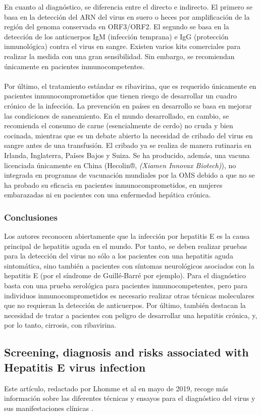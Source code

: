 \documentclass[11 pt]{article}
\begin{document}
En cuanto al diagnóstico, se diferencia entre el directo e indirecto. El primero se basa en la detección del ARN del virus en suero o heces por amplificación de la región del genoma conservada en ORF3/ORF2. El segundo se basa en la detección de los anticuerpos IgM (infección temprana) e IgG (protección inmunológica) contra el virus en sangre. Existen varios kits comerciales para realizar la medida con una gran sensibilidad. Sin embargo, se recomiendan únicamente en pacientes inmunocompetentes.\\\\
Por último, el tratamiento estándar es ribavirina, que es requerido únicamente en pacientes inmunocomprometidos que tienen riesgo de desarrollar un cuadro crónico de la infección. La prevención en países en desarrollo se basa en mejorar las condiciones de saneamiento. En el mundo desarrollado, en cambio, se recomienda el consumo de carne (esencialmente de cerdo) no cruda y bien cocinada, mientras que es un debate abierto la necesidad de cribado del virus en sangre antes de una transfusión. El cribado ya se realiza de manera rutinaria en Irlanda, Inglaterra, Países Bajos y Suiza. Se ha producido, además, una vacuna licenciada únicamente en China (Hecolin®, {\em (Xiamen Innovax Biotech)}), no integrada en programas de vacunación mundiales por la OMS debido a que no se ha probado su eficacia en pacientes inmunocomprometidos, en mujeres embarazadas ni en pacientes con una enfermedad hepática crónica. 
	
\subsubsection{Conclusiones}
Los autores reconocen abiertamente que la infección por hepatitis E es la causa principal de hepatitis aguda en el mundo. Por tanto, se deben realizar pruebas para la detección del virus no sólo a los pacientes con una hepatitis aguda sintomática, sino también a pacientes con síntomas neurológicos asociados con la hepatitis E (por el síndrome de Guillé-Barré por ejemplo). Para el diagnóstico basta con una prueba serológica para pacientes inmunocompetentes, pero para individuos inmunocomprometidos es necesario realizar otras técnicas moleculares que no requieran la detección de anticuerpos. Por último, también destacan la necesidad de tratar a pacientes con peligro de desarrollar una hepatitis crónica, y, por lo tanto, cirrosis, con ribavirina.

\subsection{Screening, diagnosis and risks associated with Hepatitis E virus infection}
Este artículo, redactado por Lhomme et al en mayo de 2019, recoge más información sobre las diferentes técnicas y ensayos para el diagnóstico del virus y sus manifestaciones clínicas \cite{Lhomme2019}.
\end{document}
